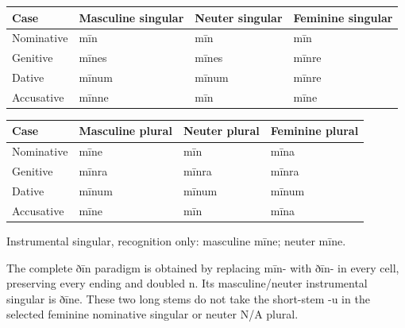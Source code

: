 \par\begingroup
\fontsize{10.5}{13.2}\selectfont
\setlength{\LTleft}{0pt}\setlength{\LTright}{\fill}
\noindent
\begin{tabular}{@{}>{\raggedright\arraybackslash}p{22.0mm}>{\raggedright\arraybackslash}p{31.188mm}>{\raggedright\arraybackslash}p{31.188mm}>{\raggedright\arraybackslash}p{31.188mm}@{}}
\toprule
\textbf{Case} & \textbf{Masculine singular} & \textbf{Neuter singular} & \textbf{Feminine singular} \\
\midrule
Nominative & mīn & mīn & mīn \\
Genitive & mīnes & mīnes & mīnre \\
Dative & mīnum & mīnum & mīnre \\
Accusative & mīnne & mīn & mīne \\
\bottomrule
\end{tabular}
\par\endgroup
\par\addvspace{5pt}
\par\begingroup
\fontsize{10.5}{13.2}\selectfont
\setlength{\LTleft}{0pt}\setlength{\LTright}{\fill}
\noindent
\begin{tabular}{@{}>{\raggedright\arraybackslash}p{22.0mm}>{\raggedright\arraybackslash}p{31.188mm}>{\raggedright\arraybackslash}p{31.188mm}>{\raggedright\arraybackslash}p{31.188mm}@{}}
\toprule
\textbf{Case} & \textbf{Masculine plural} & \textbf{Neuter plural} & \textbf{Feminine plural} \\
\midrule
Nominative & mīne & mīn & mīna \\
Genitive & mīnra & mīnra & mīnra \\
Dative & mīnum & mīnum & mīnum \\
Accusative & mīne & mīn & mīna \\
\bottomrule
\end{tabular}
\par\endgroup
Instrumental singular, recognition only: masculine mīne; neuter mīne.

The complete ðīn paradigm is obtained by replacing mīn- with ðīn- in every cell, preserving every ending and doubled n. Its masculine/\allowbreak{}neuter instrumental singular is ðīne. These two long stems do not take the short-stem -u in the selected feminine nominative singular or neuter N/\allowbreak{}A plural.

